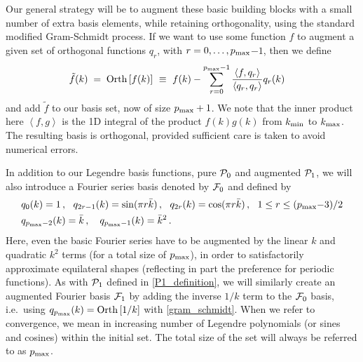 Our general strategy will be to augment these basic building blocks
with a small number of extra basis elements, while retaining orthogonality,
using the standard modified Gram-Schmidt process.
If we want to use some function $f$ to augment a given set of orthogonal functions $q_r$, with $r=0,\ldots,p_\text{max}$$-$$1$,
then we define
\begin{align}\label{gram_schmidt}
  \tilde {f}(k) \;=\;  \text{Orth}\left [f(k)\right] &~\equiv~ f(k) - \sum_{r=0}^{{p_\text{max}}\text{$-$}1}\frac{\left\langle f,q_r \right\rangle}{\left\langle q_r,q_r \right\rangle}q_r(k)
\end{align}
and add $\tilde{f}$ to our basis set, now of size $p_\text{max}+1$.
We note that the inner product here $\left\langle f,g \right\rangle$
is the 1D integral of the product $f(k)g(k)$ from ${k_\text{min}}$ to ${k_\text{max}}$.
The resulting basis is orthogonal, provided sufficient
care is taken to avoid numerical errors.

In addition to our Legendre basis functions, pure $\mathcal{P}_0$ and augmented $\mathcal{P}_1$, we will also introduce a Fourier series basis denoted by $\mathcal{F}_0$ and defined by
\begin{align}\label{F0_definition}
    &q_{0}(k)    = 1\,, ~~
    q_{2r-1}(k)   = \sin(\pi r\bar{k})\,,  ~~
    q_{2r}(k) = \cos(\pi r\bar{k})\,,  ~~  1\leq r\leq(p_\text{max}\text{$-$}3)/2\\
    &q_{p_\text{max}\text{$-$}2}(k)=\bar k\,, ~~~q_{p_\text{max}\text{$-$}1}(k)=\bar k^2\,.
    \end{align}
Here, even the basic Fourier series have to be augmented by the linear $k$ and quadratic $k^2$ terms (for a total size of $p_\text{max}$),
in order to satisfactorily approximate equilateral shapes (reflecting in part the preference for periodic functions). 
As with $\mathcal{P}_1$ defined in \eqref{P1_definition}, we will similarly create an augmented Fourier basis $\mathcal{F}_1$ by adding the inverse $1/k$ term to the  $\mathcal{F}_0$ basis, i.e.\ using $q_{p_{\rm max}}(k) = \text{Orth}\left[{1}/ {k}\right]$ with \eqref{gram_schmidt}.
When we refer to convergence, we mean in increasing number
of Legendre polynomials (or sines and cosines) within the initial set.
The total size of the set will always be referred to as $p_\text{max}$.

